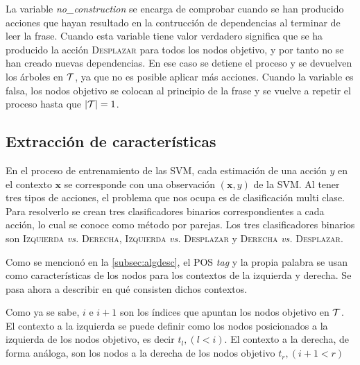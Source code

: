 La variable \emph{no\_construction} se encarga de comprobar cuando se han
producido acciones que hayan resultado en la contrucción de dependencias al
terminar de leer la frase. Cuando esta variable tiene valor verdadero significa
que se ha producido la acción \textsc{Desplazar} para todos los nodos objetivo,
y por tanto no se han creado nuevas dependencias. En ese caso se detiene el
proceso y se devuelven los árboles en ${\cal T}$, ya que no es posible aplicar
más acciones. Cuando la variable es falsa, los nodos objetivo se colocan al
principio de la frase y se vuelve a repetir el proceso hasta que $|{\cal T}| = 1$.

\subsection{Extracción de características}
\label{subsec:featureextraction}

En el proceso de entrenamiento de las \ac{SVM}, cada estimación de una acción
$y$ en el contexto $\mathbf{x}$ se corresponde con una observación
$(\mathbf{x}, y)$ de la \ac{SVM}. Al tener tres tipos de acciones, el problema
que nos ocupa es de clasificación multi clase. Para resolverlo se crean tres
clasificadores binarios correspondientes a cada acción, lo cual se conoce como
método por parejas. Los tres clasificadores binarios son \textsc{Izquierda}
\emph{vs.} \textsc{Derecha}, \textsc{Izquierda} \emph{vs.} \textsc{Desplazar} y
\textsc{Derecha} \emph{vs.}  \textsc{Desplazar}.

Como se mencionó en la \autoref{subsec:algdesc}, el \ac{POS} \emph{tag} y la
propia palabra se usan como características de los nodos para los contextos de
la izquierda y derecha. Se pasa ahora a describir en qué consisten dichos
contextos.

Como ya se sabe, $i$ e $i + 1$ son los índices que apuntan  los nodos objetivo
en ${\cal T}$. El contexto a la izquierda se puede definir como los nodos
posicionados a la izquierda de los nodos objetivo, es decir $t_l, (l < i)$. El
contexto a la derecha, de forma análoga, son los nodos a la derecha de los nodos
objetivo $t_r,(i+1 <r)$

